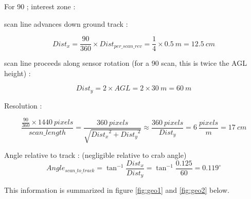 \documentclass[a4paper,11pt]{report}
\begin{document}
For 90 \degree; interest zone :

scan line advances down ground track :

\begin{equation} 
Dist_{x}=  \frac{90}{360} \times Dist_{per\_scan\_rev} = \frac{1}{4} \times 0.5~m = 12.5~cm
\end{equation}

scan line proceeds along sensor rotation (for a 90 scan, this is twice the AGL height) :

\begin{equation} 
Dist_{y}=  2 \times AGL = 2 \times 30~m = 60~m
\end{equation}

Resolution :

\begin{equation}  
\frac{ \frac{90}{360} \times 1440~pixels }{scan\_length} = 
\frac{360~pixels}{\sqrt{{Dist_x}^2+{Dist_y}^2}} \approx \frac{360~pixels}{Dist_y}= 6~ \frac{pixels}{m} = 17~cm
\end{equation}

Angle relative to track : (negligible relative to crab angle)
\begin{equation} Angle_{scan\_to\_track} = \tan^{-1} \frac{Dist_x}{Dist_y} = \tan^{-1} \frac{0.125}{60} = 0.119^\circ
\end{equation}

This information is summarized in figure \ref{fig:geo1} and \ref{fig:geo2} below.
\end{document}
